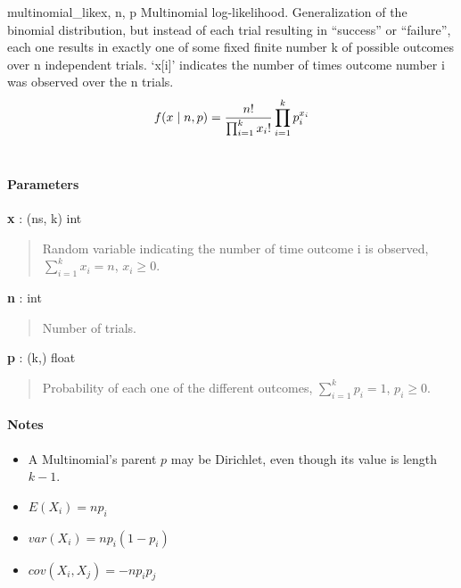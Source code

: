 \hypertarget{pymc.distributions.multinomial_like}{}
\begin{funcdesc}{multinomial\_like}{x, n, p}
Multinomial log-likelihood. Generalization of the binomial
distribution, but instead of each trial resulting in ``success'' or
``failure'', each one results in exactly one of some fixed finite number k
of possible outcomes over n independent trials. `x{[}i{]}' indicates the number
of times outcome number i was observed over the n trials.
\begin{gather}
\begin{split}f(x \mid n, p) = \frac{n!}{\prod_{i=1}^k x_i!} \prod_{i=1}^k p_i^{x_i}\end{split}\notag\\\begin{split}\end{split}\notag
\end{gather}\paragraph{Parameters}\begin{paramlist}

\item[] \textbf{x} : (ns, k) int
\begin{quote}

Random variable indicating the number of time outcome i is observed,
$\sum_{i=1}^k x_i=n$, $x_i \ge 0$.
\end{quote}

\item[] \textbf{n} : int
\begin{quote}

Number of trials.
\end{quote}

\item[] \textbf{p} : (k,) float
\begin{quote}

Probability of each one of the different outcomes,
$\sum_{i=1}^k p_i = 1$, $p_i \ge 0$.
\end{quote}
\end{paramlist}
\paragraph{Notes}
\begin{itemize}
\item {} A Multinomial's parent $p$ may be Dirichlet, even though its value is length $k-1$.
   
\item {} 
$E(X_i)=n p_i$

\item {} 
$var(X_i)=n p_i(1-p_i)$

\item {} 
$cov(X_i,X_j) = -n p_i p_j$

\end{itemize}
\end{funcdesc}


